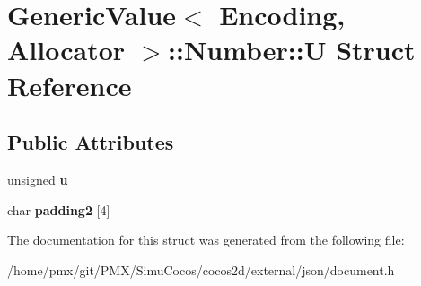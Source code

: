 \hypertarget{structGenericValue_1_1Number_1_1U}{}\section{Generic\+Value$<$ Encoding, Allocator $>$\+:\+:Number\+:\+:U Struct Reference}
\label{structGenericValue_1_1Number_1_1U}
\subsection*{Public Attributes}
\begin{DoxyCompactItemize}
\item 
\mbox{\label{structGenericValue_1_1Number_1_1U_a175e3a2bd43e6880791eb7c950d2f147}} 
unsigned {\bfseries u}
\item 
\mbox{\label{structGenericValue_1_1Number_1_1U_af219e8d5d731960d7556e0d00b899c7c}} 
char {\bfseries padding2} \mbox{[}4\mbox{]}
\end{DoxyCompactItemize}


The documentation for this struct was generated from the following file\+:\begin{DoxyCompactItemize}
\item 
/home/pmx/git/\+P\+M\+X/\+Simu\+Cocos/cocos2d/external/json/document.\+h\end{DoxyCompactItemize}
